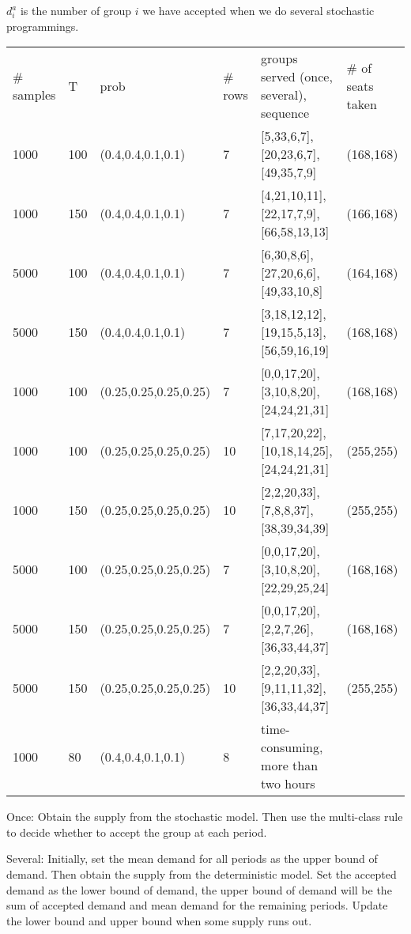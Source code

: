 $d_{i}^{a}$ is the number of group $i$ we have accepted when we do several stochastic programmings.

\begin{table}[ht]
  \begin{tabular}{l|l|l|l|l|l}
  \hline
  \# samples & T & prob & \# rows & groups served (once, several), sequence & \# of seats taken \\
  1000  & 100 & (0.4,0.4,0.1,0.1) & 7 & [5,33,6,7], [20,23,6,7], [49,35,7,9] & (168,168) \\
  1000  & 150 & (0.4,0.4,0.1,0.1) & 7 & [4,21,10,11], [22,17,7,9], [66,58,13,13] & (166,168)\\
  5000  & 100 & (0.4,0.4,0.1,0.1) & 7 & [6,30,8,6], [27,20,6,6], [49,33,10,8] & (164,168)\\
  5000  & 150 & (0.4,0.4,0.1,0.1) & 7 & [3,18,12,12], [19,15,5,13], [56,59,16,19] & (168,168)\\
  \hline
  1000  & 100 & (0.25,0.25,0.25,0.25) & 7 & [0,0,17,20], [3,10,8,20], [24,24,21,31] & (168,168)\\
  1000  & 100 & (0.25,0.25,0.25,0.25) & 10 & [7,17,20,22], [10,18,14,25], [24,24,21,31] & (255,255)\\
  1000  & 150 & (0.25,0.25,0.25,0.25) & 10 & [2,2,20,33], [7,8,8,37], [38,39,34,39] & (255,255)\\
  5000  & 100 & (0.25,0.25,0.25,0.25) & 7 & [0,0,17,20], [3,10,8,20], [22,29,25,24] & (168,168)\\
  5000  & 150 & (0.25,0.25,0.25,0.25) & 7 & [0,0,17,20], [2,2,7,26], [36,33,44,37] & (168,168)\\
  5000  & 150 & (0.25,0.25,0.25,0.25) & 10 & [2,2,20,33], [9,11,11,32], [36,33,44,37] & (255,255)\\
  \hline
  1000  & 80 & (0.4,0.4,0.1,0.1) & 8 & time-consuming, more than two hours &  \\
  \hline
  \end{tabular}
\end{table}

Once: Obtain the supply from the stochastic model. Then use the multi-class rule to decide whether to accept the group at each period.

Several: Initially, set the mean demand for all periods as the upper bound of demand. Then obtain the supply from the deterministic model. Set the accepted demand as the lower bound of demand, the upper bound of demand will be the sum of accepted demand and mean demand for the remaining periods. Update the lower bound and upper bound when some supply runs out.


